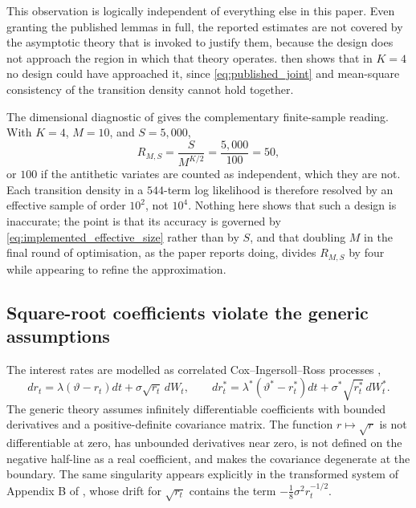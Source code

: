 \documentclass[11pt]{article}
\theoremstyle{definition}
\begin{document}
This observation is logically independent of everything else in this paper. Even granting the published lemmas in full, the reported estimates are not covered by the asymptotic theory that is invoked to justify them, because the design does not approach the region in which that theory operates.  then shows that in $K=4$ no design could have approached it, since \eqref{eq:published_joint} and mean-square consistency of the transition density cannot hold together.

The dimensional diagnostic of  gives the complementary finite-sample reading. With $K=4$, $M=10$, and $S=5{,}000$,
\begin{equation}\label{eq:implemented_effective_size}
R_{M,S}=\frac{S}{M^{K/2}}=\frac{5{,}000}{100}=50,
\end{equation}
or $100$ if the antithetic variates are counted as independent, which they are not. Each transition density in a $544$-term log likelihood is therefore resolved by an effective sample of order $10^2$, not $10^4$. Nothing here shows that such a design is inaccurate; the point is that its accuracy is governed by \eqref{eq:implemented_effective_size} rather than by $S$, and that doubling $M$ in the final round of optimisation, as the paper reports doing, divides $R_{M,S}$ by four while appearing to refine the approximation.

\subsection{Square-root coefficients violate the generic assumptions}

The interest rates are modelled as correlated Cox--Ingersoll--Ross processes \citep{CoxIngersollRoss1985},
\begin{equation}\label{eq:cir_rates}
dr_t=\lambda(\vartheta-r_t)dt+\sigma\sqrt{r_t}\,dW_t,
\qquad
d r_t^*=\lambda^*(\vartheta^*-r_t^*)dt+\sigma^*\sqrt{r_t^*}\,dW_t^*.
\end{equation}
The generic theory assumes infinitely differentiable coefficients with bounded derivatives and a positive-definite covariance matrix. The function $r\mapsto\sqrt r$ is not differentiable at zero, has unbounded derivatives near zero, is not defined on the negative half-line as a real coefficient, and makes the covariance degenerate at the boundary. The same singularity appears explicitly in the transformed system of Appendix B of \citet{BrandtSantaClara2002}, whose drift for $\sqrt{r_t}$ contains the term $-\tfrac18\sigma^2r_t^{-1/2}$.
\end{document}
